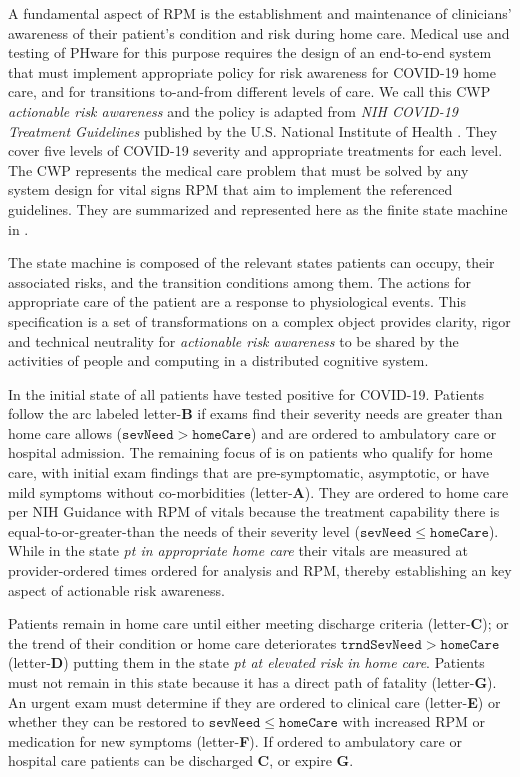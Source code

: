 A fundamental aspect of RPM is the establishment and maintenance of clinicians' awareness of their patient’s condition and risk during home care.
Medical use and testing of PHware for this purpose requires the design of an end-to-end system that must implement appropriate policy for risk awareness for COVID-19 home care, and for transitions to-and-from different levels of care.
We call this CWP \emph{actionable risk awareness} and the policy is adapted from \emph{NIH COVID-19 Treatment Guidelines} published by the U.S. National Institute of Health \cite{NIH}.
They cover five levels of COVID-19 severity and appropriate treatments for each level.
The CWP represents the medical care problem that must be solved by any system design for vital signs RPM that aim to implement the referenced guidelines.
They are summarized and represented here as the finite state machine in .

The state machine is composed of the relevant states patients can occupy, their associated risks, and the transition conditions among them. The actions for appropriate care of the patient are a response to physiological events. This specification is a set of transformations on a complex object provides clarity, rigor and technical neutrality for \emph{actionable risk awareness} to be shared by the activities of people and computing in a distributed cognitive system.

In the initial state of  all patients have tested positive for COVID-19. Patients follow the arc labeled letter-\textbf{B} if exams find their severity needs are greater than home care allows ($\mathtt{sevNeed} > \mathtt{homeCare}$) and are ordered to ambulatory care or hospital admission.
The remaining focus of  is on patients who qualify for home care, with initial exam findings that are pre-symptomatic, asymptotic, or have mild symptoms without co-morbidities (letter-\textbf{A}).
They are ordered to home care per NIH Guidance with RPM of vitals because the treatment capability there is equal-to-or-greater-than the needs of their severity level ($\mathtt{sevNeed} \le \mathtt{homeCare}$).
While in the state \emph{pt in appropriate home care} their vitals are measured at provider-ordered times ordered for analysis and RPM, thereby establishing an key aspect of actionable risk awareness.

Patients remain in home care until either meeting discharge criteria (letter-\textbf{C}); or the trend of their condition or home care deteriorates $\mathtt{trndSevNeed} > \mathtt{homeCare}$ (letter-\textbf{D}) putting them in the state \emph{pt at elevated risk in home care}.
Patients must not remain in this state because it has a direct path of fatality (letter-\textbf{G}).
An urgent exam must determine if they are ordered to clinical care (letter-\textbf{E}) or whether they can be restored to $\mathtt{sevNeed} \le \mathtt{homeCare}$ with increased RPM or medication for new symptoms (letter-\textbf{F}).
If ordered to ambulatory care or hospital care patients can be discharged \textbf{C}, or expire \textbf{G}.

